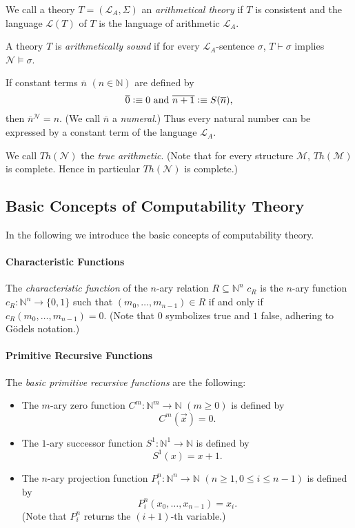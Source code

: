 We call a theory $T = (\mathcal{L}_A, \Sigma)$ an \textit{arithmetical theory} if $T$ is consistent and  the language $\mathcal{L}(T)$ of $T$ is the language of arithmetic $\mathcal{L}_A$.

A theory $T$ is \textit{arithmetically sound} if for every $\mathcal{L}_A$-sentence $\sigma$, $T \vdash \sigma$ implies $\mathcal{N} \vDash \sigma$.

If constant terms $\overline{n}$ $(n \in \mathbb{N})$ are defined by
\[ \overline{0}\vcentcolon \equiv 0 \text{ and }\overline{n+1}\vcentcolon \equiv S(\overline{n}), \]
then $\overline{n}^\mathcal{N} = n$. (We call $\overline{n}$ a \textit{numeral}.) Thus every natural number can be expressed by a constant term of the language $\mathcal{L}_A$. 

We call $\mathit{Th}(\mathcal{N})$ the \textit{true arithmetic}. (Note that for every structure $\mathcal{M}$, $\mathit{Th}(\mathcal{M})$ is complete. Hence in particular $\mathit{Th}(\mathcal{N})$ is complete.) 

\subsection{Basic Concepts of Computability Theory}
In the following we introduce the  basic concepts of computability theory.
\paragraph{Characteristic Functions}
The \textit{characteristic function} of the $n$-ary relation $R \subseteq \mathbb{N}^n$ $c_R$ is the $n$-ary function $c_R: \mathbb{N}^n \rightarrow \lbrace 0, 1 \rbrace$ such that $(m_0, \ldots, m_{n-1}) \in R$ if and only if $c_R(m_0, \ldots, m_{n-1}) = 0$. (Note that $0$ symbolizes true and $1$ false, adhering to G\"odels notation.)



\paragraph{Primitive Recursive Functions}

The \textit{basic primitive recursive functions} are the following:
\begin{itemize}
\item The $m$-ary zero function $C^m: \mathbb{N}^m \rightarrow \mathbb{N}$ $(m \ge 0)$ is defined by 
\[C^m(\overrightarrow{x}) = 0. \]
\item The $1$-ary successor function $S^1: \mathbb{N}^1 \rightarrow \mathbb{N}$ is defined by
\[ S^1(x) = x + 1. \]
\item The $n$-ary projection function $P_i^n:\mathbb{N}^n \rightarrow \mathbb{N}$ $(n \ge 1, 0 \le i \le n-1)$ is defined by
\[ P_i^n(x_0,\ldots, x_{n-1}) = x_{i} .\]
(Note that $P_i^n$ returns the $(i+1)$-th variable.)
\end{itemize}

